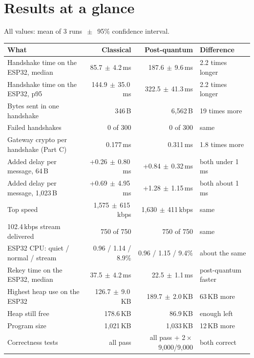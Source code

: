 \documentclass[10pt,a4paper]{article}
\newcommand{\PM}{\ensuremath{\,\pm\,}}
\begin{document}
\section*{Results at a glance}

All values: mean of 3 runs $\PM$ 95\% confidence interval.

\begin{table}[H]\centering\small
\begin{tabularx}{\linewidth}{Lrrl}
\toprule
What & Classical & Post-quantum & Difference \\
\midrule
Handshake time on the ESP32, median & 85.7\PM4.2\,ms & 187.6\PM9.6\,ms & 2.2 times longer \\
Handshake time on the ESP32, p95 & 144.9\PM35.0\,ms & 322.5\PM41.3\,ms & 2.2 times longer \\
Bytes sent in one handshake & 346\,B & 6,562\,B & 19 times more \\
Failed handshakes & 0 of 300 & 0 of 300 & same \\
Gateway crypto per handshake (Part C) & 0.177\,ms & 0.311\,ms & 1.8 times more \\
Added delay per message, 64\,B & +0.26\PM0.80\,ms & +0.84\PM0.32\,ms & both under 1\,ms \\
Added delay per message, 1,023\,B & +0.69\PM4.95\,ms & +1.28\PM1.15\,ms & both about 1\,ms \\
Top speed & 1,575\PM615\,kbps & 1,630\PM411\,kbps & same \\
102.4\,kbps stream delivered & 750 of 750 & 750 of 750 & same \\
ESP32 CPU: quiet / normal / stream & 0.96 / 1.14 / 8.9\% & 0.96 / 1.15 / 9.4\% & about the same \\
Rekey time on the ESP32, median & 37.5\PM4.2\,ms & 22.5\PM1.1\,ms & post-quantum faster \\
Highest heap use on the ESP32 & 126.7\PM9.0\,KB & 189.7\PM2.0\,KB & 63\,KB more \\
Heap still free & 178.6\,KB & 86.9\,KB & enough left \\
Program size & 1,021\,KB & 1,033\,KB & 12\,KB more \\
Correctness tests & all pass & all pass + 2\,$\times$\,9,000/9,000 & both correct \\
\bottomrule
\end{tabularx}
\end{table}
\end{document}
